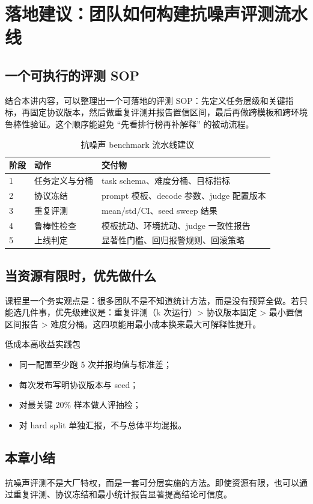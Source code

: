 \section{落地建议：团队如何构建抗噪声评测流水线}

\subsection{一个可执行的评测 SOP}
结合本讲内容，可以整理出一个可落地的评测 SOP：先定义任务层级和关键指标，再固定协议版本，然后做重复评测并报告置信区间，最后再做跨模板和跨环境鲁棒性验证。这个顺序能避免 ``先看排行榜再补解释'' 的被动流程。

\begin{table}[H]
\centering
\begin{tabular}{p{1.2cm}p{3.7cm}p{5.3cm}}
\toprule
\textbf{阶段} & \textbf{动作} & \textbf{交付物} \\
\midrule
1 & 任务定义与分桶 & task schema、难度分桶、目标指标 \\
2 & 协议冻结 & prompt 模板、decode 参数、judge 配置版本 \\
3 & 重复评测 & mean/std/CI、seed sweep 结果 \\
4 & 鲁棒性检查 & 模板扰动、环境扰动、judge 一致性报告 \\
5 & 上线判定 & 显著性门槛、回归报警规则、回滚策略 \\
\bottomrule
\end{tabular}
\caption{抗噪声 benchmark 流水线建议}
\end{table}

\subsection{当资源有限时，优先做什么}
课程里一个务实观点是：很多团队不是不知道统计方法，而是没有预算全做。若只能选几件事，优先级建议是：重复评测（k 次运行）> 协议版本固定 > 最小置信区间报告 > 难度分桶。这四项能用最小成本换来最大可解释性提升。

\begin{importantbox}{低成本高收益实践包}
\begin{itemize}
    \item 同一配置至少跑 5 次并报均值与标准差；
    \item 每次发布写明协议版本与 seed；
    \item 对最关键 20\% 样本做人评抽检；
    \item 对 hard split 单独汇报，不与总体平均混报。
\end{itemize}
\end{importantbox}

\subsection{本章小结}
抗噪声评测不是大厂特权，而是一套可分层实施的方法。即使资源有限，也可以通过重复评测、协议冻结和最小统计报告显著提高结论可信度。

